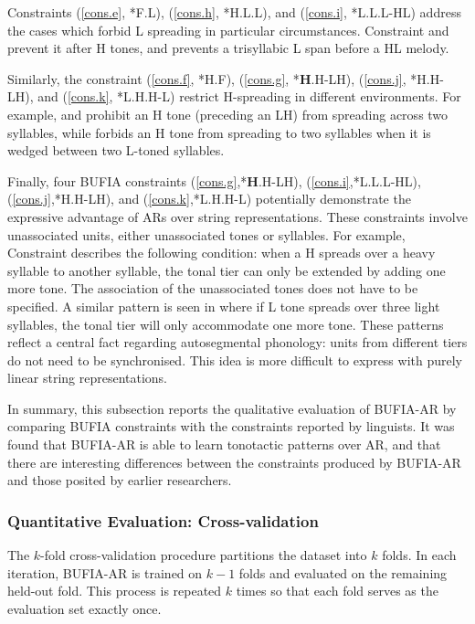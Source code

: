 Constraints (\ref{cons.e}, *F.L), (\ref{cons.h}, *H.L.L), and (\ref{cons.i}, 
*L.L.L-HL) address the cases which forbid L spreading in particular 
circumstances. Constraint  and  prevent it after H 
tones, and  prevents a trisyllabic L span before a HL melody.

Similarly, the constraint (\ref{cons.f}, *H.F), (\ref {cons.g}, *\textbf{H}.H-LH), 
(\ref{cons.j}, *H.H-LH), and (\ref{cons.k}, *L.H.H-L) restrict H-spreading 
in different environments. For example,  and  prohibit 
an H tone (preceding an LH) from spreading across two syllables, while 
 forbids an H tone from spreading to two syllables when it is 
wedged between two L-toned syllables.

Finally, four BUFIA constraints (\ref{cons.g},*\textbf{H}.H-LH), 
(\ref{cons.i},*L.L.L-HL), (\ref{cons.j},*H.H-LH), and (\ref{cons.k},*L.H.H-L)
potentially demonstrate the expressive advantage of ARs over string
representations. These constraints involve unassociated units, either
unassociated tones or syllables. For example, Constraint
 describes the following condition: when a H spreads over a heavy
syllable to another syllable, the tonal tier can only be extended by
adding one more tone. The association of the unassociated tones does not
have to be specified. A similar pattern is seen in  where
if L tone spreads over three light syllables, the tonal tier will only
accommodate one more tone. These patterns reflect a central fact
regarding autosegmental phonology: units from different tiers do not
need to be synchronised. This idea is more difficult to express with
purely linear string representations.

In summary, this subsection reports the qualitative evaluation of 
BUFIA-AR by comparing BUFIA constraints with the constraints reported
by linguists. It was found that BUFIA-AR is able to learn tonotactic
patterns over AR, and that there are interesting differences between
the constraints produced by BUFIA-AR and those posited by earlier
researchers.


\subsubsection{Quantitative Evaluation: Cross-validation}

The $k$-fold cross-validation procedure partitions the dataset into 
$k$ folds. In each iteration, BUFIA-AR is trained on $k-1$ folds 
and evaluated on the remaining held-out fold. This process is 
repeated $k$ times so that each fold serves as the evaluation 
set exactly once.

